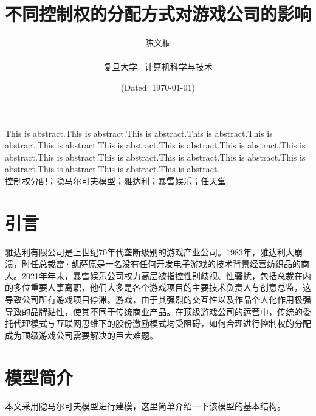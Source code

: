 \documentclass[hyperref]{ctexart}
\title{\textbf{不同控制权的分配方式对游戏公司的影响}}
\author{\sffamily 陈义桐 \\ \\复旦大学 \ 计算机科学与技术}
\date{(Dated: \today)}
\begin{document}
	\maketitle
		This is abstract.This is abstract.This is abstract.This is abstract.This is abstract.This is abstract.This is abstract.This is abstract.This is abstract.This is abstract.This is abstract.This is abstract.This is abstract.This is abstract.This is abstract.This is abstract.This is abstract.This is abstract.\\
		
		控制权分配；隐马尔可夫模型；雅达利；暴雪娱乐；任天堂
	\begin{multicols}{2}
	\section{引言}
	雅达利有限公司是上世纪70年代垄断级别的游戏产业公司。1983年，雅达利大崩溃，时任总裁雷·凯萨原是一名没有任何开发电子游戏的技术背景经营纺织品的商人。2021年年末，暴雪娱乐公司权力高层被指控性别歧视、性骚扰，包括总裁在内的多位重要人事离职，他们大多是各个游戏项目的主要技术负责人与创意总监，这导致公司所有游戏项目停滞。游戏，由于其强烈的交互性以及作品个人化作用极强导致的品牌黏性，使其不同于传统商业产品。在顶级游戏公司的运营中，传统的委托代理模式与互联网思维下的股份激励模式均受阻碍，如何合理进行控制权的分配成为顶级游戏公司需要解决的巨大难题。
	\section{模型简介}
	本文采用隐马尔可夫模型进行建模，这里简单介绍一下该模型的基本结构。

\end{multicols}
\end{document}
